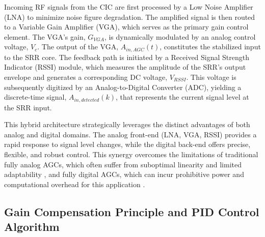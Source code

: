 \documentclass[journal]{IEEEtran}
\begin{document}
Incoming RF signals from the CIC are first processed by a Low Noise Amplifier (LNA) to minimize noise figure degradation. The amplified signal is then routed to a Variable Gain Amplifier (VGA), which serves as the primary gain control element. The VGA's gain, $G_{VGA}$, is dynamically modulated by an analog control voltage, $V_c$. The output of the VGA, $A_{in,AGC}(t)$, constitutes the stabilized input to the SRR core. The feedback path is initiated by a Received Signal Strength Indicator (RSSI) module, which measures the amplitude of the SRR's output envelope and generates a corresponding DC voltage, $V_{RSSI}$. This voltage is subsequently digitized by an Analog-to-Digital Converter (ADC), yielding a discrete-time signal, $A_{in,detected}(k)$, that represents the current signal level at the SRR input.

This hybrid architecture strategically leverages the distinct advantages of both analog and digital domains. The analog front-end (LNA, VGA, RSSI) provides a rapid response to signal level changes, while the digital back-end offers precise, flexible, and robust control. This synergy overcomes the limitations of traditional fully analog AGCs, which often suffer from suboptimal linearity and limited adaptability \cite{Zhao2023AnAF}, and fully digital AGCs, which can incur prohibitive power and computational overhead for this application \cite{Li2020DigitalAC}.



\subsection{Gain Compensation Principle and PID Control Algorithm}
\label{subsec:principle_and_algorithm}
\end{document}
